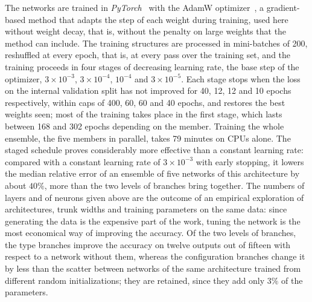 The networks are trained in \textit{PyTorch}~\cite{pytorch} with the AdamW
optimizer~\cite{adamw}, a gradient-based method that adapts the step of each
weight during training, used here without weight decay, that is, without the
penalty on large weights that the method can include. The training structures
are processed in mini-batches of 200, reshuffled at every epoch, that is, at
every pass over the training set, and the training proceeds in four stages of
decreasing learning rate, the base step of the optimizer, $3\times10^{-3}$,
$3\times10^{-4}$, $10^{-4}$ and $3\times10^{-5}$. Each stage stops when the loss on the internal
validation split has not improved for 40, 12, 12 and 10 epochs respectively,
within caps of 400, 60, 60 and 40 epochs, and restores the best weights seen;
most of the training takes place in the first stage, which lasts between 168
and 302 epochs depending on the member. Training the whole ensemble, the five members in
parallel, takes 79 minutes on CPUs alone. The staged schedule proves
considerably more effective than a constant learning rate: compared with a
constant learning rate of $3\times10^{-3}$ with early stopping, it lowers the
median relative error of an ensemble of five networks of this architecture by
about $40\%$, more than the two levels of branches bring together. The numbers
of layers and of neurons given above are the outcome of an empirical
exploration of architectures, trunk widths and training parameters on the same
data: since generating the data is the expensive part of the work, tuning the
network is the most economical way of improving the accuracy. Of the two levels
of branches, the type
branches improve the accuracy on twelve outputs out of fifteen with respect to
a network without them, whereas the configuration branches change it by less
than the scatter between networks of the same architecture trained from
different random initializations; they are retained, since they add only
$3\%$ of the parameters.

